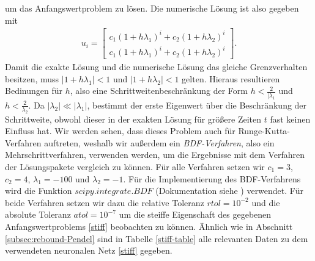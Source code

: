 um das Anfangswertproblem zu lösen. Die numerische Lösung ist also gegeben mit
\begin{align*}
       u_{i}=
       \begin{bmatrix}
              c_1 (1+h\lambda_1)^{i} + c_2 (1+h\lambda_2)^{i}\\
              c_1 (1+h\lambda_1)^{i} + c_2 (1+h\lambda_2)^{i}
       \end{bmatrix}.
\end{align*}
Damit die exakte Lösung und die numerische Lösung das gleiche Grenzverhalten besitzen, muss $|1 + h\lambda_1|<1$ und
$|1 + h\lambda_2|<1$ gelten. Hieraus resultieren Bedinungen für $h$, also eine Schrittweitenbeschränkung der Form
$h<\frac{2}{|\lambda_1}$ und $h<\frac{2}{\lambda_2}$. Da $|\lambda_2| \ll |\lambda_1|$, bestimmt der erste Eigenwert
über die Beschränkung der Schrittweite, obwohl dieser in der exakten Lösung für größere Zeiten $t$ fast keinen Einfluss
hat. Wir werden sehen, dass dieses Problem auch für Runge-Kutta-Verfahren auftreten, weshalb wir außerdem ein
\textit{BDF-Verfahren}, also ein Mehrschrittverfahren, verwenden werden, um die Ergebnisse mit dem Verfahren der
Lösungspakete vergleich zu können. Für alle Verfahren setzen wir $c_1=3$, $c_2=4$, $\lambda_1 = -100$ und $\lambda_2=-1$.
Für die Implementierung des BDF-Verfahrens wird die Funktion $scipy.integrate.BDF$ (Dokumentation siehe
\cite{ScipyIntegrateBDF}) verwendet. Für beide Verfahren setzen wir dazu die relative Toleranz $rtol=10^{-2}$ und die
absolute Toleranz $atol=10^{-7}$ um die steiffe Eigenschaft des gegebenen Anfangswertproblems \eqref{stiff} beobachten
zu können. Ähnlich wie in Abschnitt \ref{subsec:rebound-Pendel} sind in Tabelle \ref{stiff-table} alle relevanten Daten
zu dem verwendeten neuronalen Netz \eqref{stiff} gegeben.
